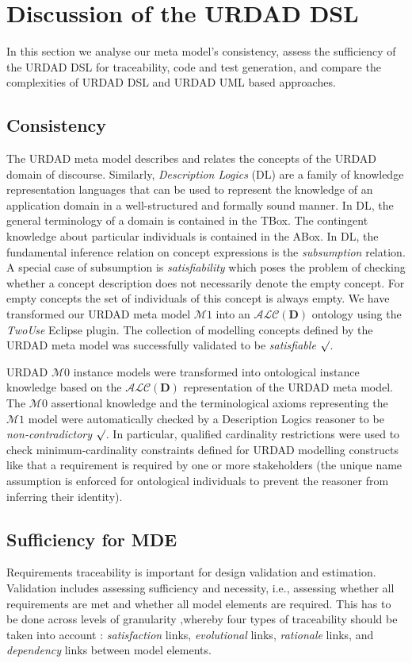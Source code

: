 \section{Discussion of the URDAD DSL \label{sec:assessment}}

In this section we analyse our meta model's consistency, assess the sufficiency of the URDAD DSL for traceability, code and test generation, and compare the complexities of URDAD DSL and URDAD UML based approaches.

\subsection{Consistency}
The URDAD meta model describes and relates the concepts of the URDAD domain of discourse. Similarly, \emph{Description Logics} (DL) are a family of knowledge representation languages that can be used to represent the knowledge of an application domain in a well-structured and formally sound manner. In DL, the general terminology of a domain is contained in the TBox. The contingent knowledge about particular individuals is contained in the ABox. In DL, the fundamental inference relation on concept expressions is the \emph{subsumption} relation. A special case of subsumption is \emph{satisfiability} which poses the problem of checking whether a concept description does not necessarily denote the empty concept. For empty concepts 
the set of individuals of this concept is always empty. We have transformed our URDAD meta model $\mathcal{M}1$ into an $\mathcal{ALC}(\textbf{D})$ ontology using the \emph{TwoUse} \cite{parreiras_using_2010} Eclipse plugin. The collection of modelling concepts defined by the URDAD meta model was successfully validated to be \emph{satisfiable} $\surd$.

URDAD $\mathcal{M}0$ instance models were transformed into ontological instance knowledge based on the $\mathcal{ALC}(\textbf{D})$ representation of the URDAD meta model. The $\mathcal{M}0$ assertional knowledge and the terminological axioms representing the $\mathcal{M}1$ model were automatically checked by a 
Description Logics reasoner to be \emph{non-contradictory} $\surd$. In particular, qualified cardinality restrictions were used to check minimum-cardinality constraints defined for URDAD modelling constructs like that a requirement is required by one or more stakeholders (the unique name assumption is enforced for ontological individuals to prevent the reasoner from inferring their identity). 

\subsection{Sufficiency for MDE}
Requirements traceability is important for design validation and estimation. Validation includes assessing sufficiency and necessity, i.e., assessing whether all requirements are met and whether all model elements are required. This has to be done across levels of granularity \cite{dick_design_2005},whereby four types of traceability should be taken into account \cite{ramesh_toward_2001}: \emph{satisfaction} links, \emph{evolutional} links, \emph{rationale} links, and \emph{dependency} links between model elements.

